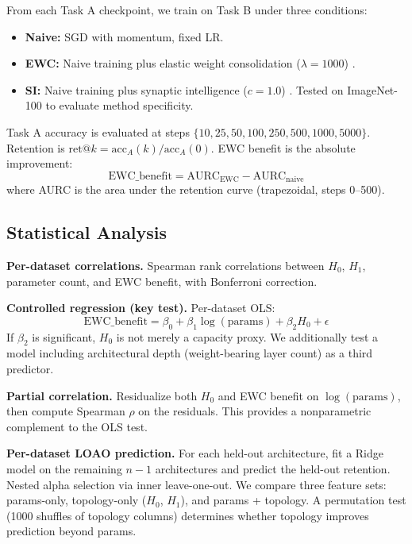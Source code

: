 \documentclass{article}
\begin{document}
From each Task A checkpoint, we train on Task B under three conditions:
\begin{itemize}[nosep,leftmargin=*]
    \item \textbf{Naive:} SGD with momentum, fixed LR.
    \item \textbf{EWC:} Naive training plus elastic weight consolidation ($\lambda = 1000$) \citep{kirkpatrick2017overcoming}.
    \item \textbf{SI:} Naive training plus synaptic intelligence ($c = 1.0$) \citep{zenke2017continual}. Tested on ImageNet-100 to evaluate method specificity.
\end{itemize}

Task A accuracy is evaluated at steps $\{10, 25, 50, 100, 250, 500, 1000, 5000\}$. Retention is $\text{ret}@k = \text{acc}_A(k) / \text{acc}_A(0)$. EWC benefit is the absolute improvement:
\begin{equation}
    \text{EWC\_benefit} = \text{AURC}_{\text{EWC}} - \text{AURC}_{\text{naive}}
\end{equation}
where AURC is the area under the retention curve (trapezoidal, steps 0--500).

\subsection{Statistical Analysis}

\textbf{Per-dataset correlations.} Spearman rank correlations between $H_0$, $H_1$, parameter count, and EWC benefit, with Bonferroni correction.

\textbf{Controlled regression (key test).} Per-dataset OLS:
\begin{equation}
    \text{EWC\_benefit} = \beta_0 + \beta_1 \log(\text{params}) + \beta_2 H_0 + \epsilon
    \label{eq:controlled}
\end{equation}
If $\beta_2$ is significant, $H_0$ is not merely a capacity proxy. We additionally test a model including architectural depth (weight-bearing layer count) as a third predictor.

\textbf{Partial correlation.} Residualize both $H_0$ and EWC benefit on $\log(\text{params})$, then compute Spearman $\rho$ on the residuals. This provides a nonparametric complement to the OLS test.

\textbf{Per-dataset LOAO prediction.} For each held-out architecture, fit a Ridge model on the remaining $n - 1$ architectures and predict the held-out retention. Nested alpha selection via inner leave-one-out. We compare three feature sets: params-only, topology-only ($H_0$, $H_1$), and params + topology. A permutation test (1000 shuffles of topology columns) determines whether topology improves prediction beyond params.
\end{document}
